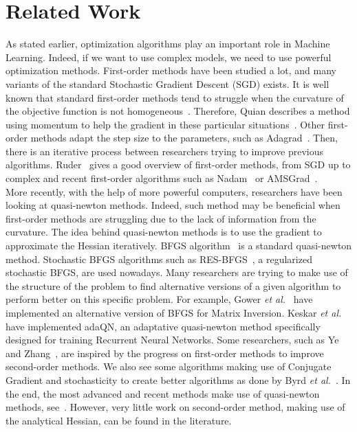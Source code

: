 \documentclass[conference]{IEEEtran}
\begin{document}
\section{Related Work}
\label{sec:rel_work}

As stated earlier, optimization algorithms play an important role in Machine Learning. Indeed, if we want to use complex models, we need to use powerful optimization methods. First-order methods have been studied a lot, and many variants of the standard Stochastic Gradient Descent (SGD) exists. It is well known that standard first-order methods tend to struggle when the curvature of the objective function is not homogeneous~\cite{sutton_two_1986}. Therefore, Quian describes a method using momentum to help the gradient in these particular situations~\cite{qian_momentum_1999}. Other first-order methods adapt the step size to the parameters, such as Adagrad~\cite{duchi_adaptive_2011}. Then, there is an iterative process between researchers trying to improve previous algorithms. Ruder~\cite{ruder_overview_2016} gives a good overview of first-order methods, from SGD up to complex and recent first-order algorithms such as Nadam~\cite{dozat_incorporating_2016} or AMSGrad~\cite{reddi_convergence_2018}. \\

More recently, with the help of more powerful computers, researchers have been looking at quasi-newton methods. Indeed, such method may be beneficial when first-order methods are struggling due to the lack of information from the curvature. The idea behind quasi-newton methods is to use the gradient to approximate the Hessian iteratively. BFGS algorithm~\cite{fletcher_practical_1987} is a standard quasi-newton method. Stochastic BFGS algorithms such as RES-BFGS~\cite{mokhtari_res:_2014}, a regularized stochastic BFGS, are used nowadays. Many researchers are trying to make use of the structure of the problem to find alternative versions of a given algorithm to perform better on this specific problem. For example, Gower {\it et al.}~\cite{gower_accelerated_2018} have implemented an alternative version of BFGS for Matrix Inversion. Keskar {\it et al.}~\cite{keskar_adaqn:_2016} have implemented adaQN, an adaptative quasi-newton method specifically designed for training Recurrent Neural Networks. Some researchers, such as Ye and Zhang~\cite{ye_nestrovs_2017}, are inspired by the progress on first-order methods to improve second-order methods. We also see some algorithms making use of Conjugate Gradient and stochasticity to create better algorithms as done by Byrd {\it et al.}~\cite{byrd_use_2011}. In the end, the most advanced and recent methods make use of quasi-newton methods, see~\cite{kiros_training_2013,bordes_sgd-qn:_2009,bordes_erratum:_2010,agarwal_second-order_2016}. However, very little work on second-order method, making use of the analytical Hessian, can be found in the literature.
\end{document}
